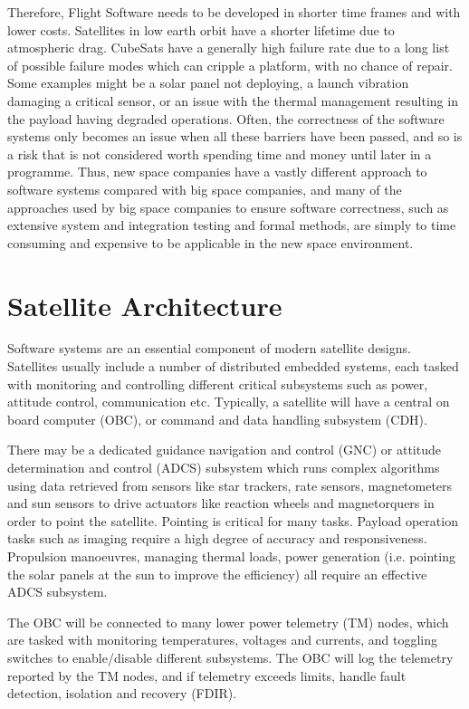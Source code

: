 \documentclass[../report.tex]{subfiles}
\begin{document}
Therefore, Flight Software needs to be developed in shorter time frames and with
lower costs. Satellites in low earth orbit have a shorter lifetime due to
atmospheric drag. CubeSats have a generally high failure rate due to a long
list of possible failure modes which can cripple a platform, with no chance of
repair. Some examples might be a solar panel not deploying, a launch vibration
damaging a critical sensor, or an issue with the thermal management resulting
in the payload having degraded operations. Often, the correctness of the
software systems only becomes an issue when all these barriers have been
passed, and so is a risk that is not considered worth spending time and money
until later in a programme. Thus, new space companies have a vastly different
approach to software systems compared with big space companies, and many of the
approaches used by big space companies to ensure software correctness, such as
extensive system and integration testing and formal methods, are simply to time
consuming and expensive to be applicable in the new space environment.

\section{Satellite Architecture}

Software systems are an essential component of modern satellite designs.
Satellites usually include a number of distributed embedded systems, each
tasked with monitoring and controlling different critical subsystems such as
power, attitude control, communication etc. Typically, a satellite will have a
central on board computer (OBC), or command and data handling subsystem (CDH).

There may be a dedicated guidance navigation and control (GNC) or attitude
determination and control (ADCS) subsystem which runs complex algorithms using
data retrieved from sensors like star trackers, rate sensors, magnetometers and
sun sensors to drive actuators like reaction wheels and magnetorquers in order
to point the satellite. Pointing is critical for many tasks. Payload operation
tasks such as imaging require a high degree of accuracy and responsiveness.
Propulsion manoeuvres, managing thermal loads, power generation (i.e. pointing
the solar panels at the sun to improve the efficiency) all require an effective
ADCS subsystem.

The OBC will be connected to many lower power telemetry (TM) nodes, which are
tasked with monitoring temperatures, voltages and currents, and toggling switches
to enable/disable different subsystems. The OBC will log the telemetry reported
by the TM nodes, and if telemetry exceeds limits, handle fault detection,
isolation and recovery (FDIR).
\end{document}
